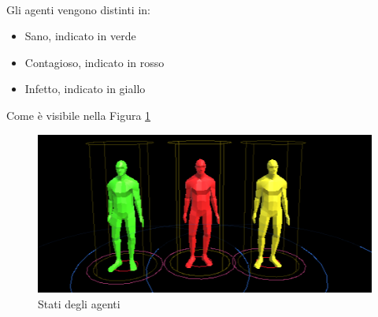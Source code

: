 \documentclass[12pt, openany]{book}
\begin{document}
		\\Gli agenti vengono distinti in:
		\begin{itemize}
			\item Sano, indicato in verde
			\item Contagioso, indicato in rosso
			\item Infetto, indicato in giallo
			
		\end{itemize} 
		Come è visibile nella Figura \ref{fig:agenti}
	\begin{figure}[H]
		\centering
		\includegraphics[width=1\linewidth]{"Immagini/Agenti"}
		\caption{Stati degli agenti}
		\label{fig:agenti}
	\end{figure}
\end{document}
